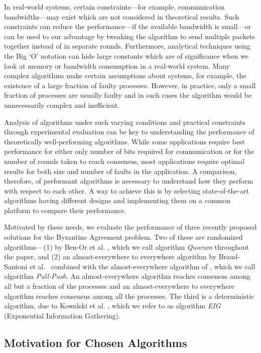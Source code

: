 In real-world systems, certain constraints---for example, communication
ban\-d\-widths---may exist which are not considered in theoretical results.
Such constraints can reduce the performance---if the available bandwidth is
small---or can be used to our advantage by tweaking the algorithm to send
multiple packets together instead of in separate rounds. Furthermore,
analytical techniques using the Big `O' notation can hide large constants which
are of significance when we look at memory or bandwidth consumption in
a real-world system. Many complex algorithms make certain assumptions about
systems, for example, the existence of a large fraction of faulty processes.
However, in practice, only a small fraction of processes are usually faulty and
in such cases the algorithm would be unnecessarily complex and inefficient.


Analysis of algorithms under such varying conditions and practical constraints
through experimental evaluation can be key to understanding the performance of
theoretically well-performing algorithms.  While some applications require best
performance for either only number of bits required for
communication or for the number of rounds taken to reach consensus, most
applications \cite{YJC} require optimal results for both size and number of
faults in the application. A comparison, therefore, of performant algorithms is
necessary to understand how they perform with respect to each other. A way to
achieve this is by selecting state-of-the-art algorithms having different
designs and implementing them on a common platform to compare their
performance.

Motivated by these needs, we evaluate the performance of three recently
proposed solutions for the Byzantine Agreement problem. Two of these are
randomized algorithms---(1) by Ben-Or et al. \cite{BPV06}, which we call
algorithm \textit{Quorum} throughout the paper, and (2) an almost-everywhere to
everywhere algorithm by Braud-Santoni et al.~\cite{BGH13} combined with the
almost-everywhere algorithm of \cite{KSSV06}, which we call algorithm
\textit{Pull-Push}. An almost-everywhere algorithm reaches consensus among all
but a fraction of the processes and an almost-everywhere to everywhere
algorithm reaches consensus among all the processes. 
The third is a deterministic algorithm, due to Kowalski et
al. \cite{KM13}, which we refer to as algorithm \textit{EIG} (Exponential
Information Gathering). 

\subsection{Motivation for Chosen Algorithms}

